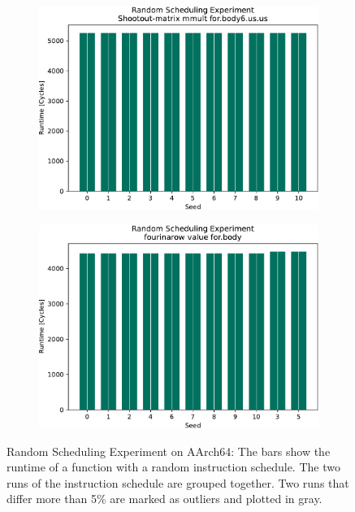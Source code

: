 \begin{figure}
\begin{subfigure}{0.45\textwidth}
        \includegraphics[width=\textwidth]{img/random-scheduling-experiment-pi-collected/Shootout-matrix-crop.pdf}
        \caption{}
        \label{fig:eval:rndm:aarch64:e}
    \end{subfigure}
    \hfill
    \begin{subfigure}{0.45\textwidth}
        \includegraphics[width=\textwidth]{img/random-scheduling-experiment-pi-collected/fourinarow-crop.pdf}
        \caption{}
        \label{fig:eval:rndm:aarch64:f}
    \end{subfigure}
    \caption[Random Scheduling Experiment on AArch64]{Random Scheduling Experiment on AArch64:
    The bars show the runtime of a function with a random instruction schedule.
    The two runs of the instruction schedule are grouped together.
    Two runs that differ more than 5\% are marked as outliers and plotted in gray.}
    \label{fig:eval:rndm:aarch64}
\end{figure}

